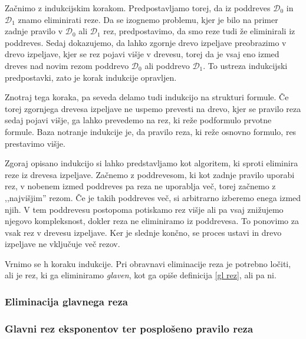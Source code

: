 Začnimo z indukcijskim korakom. Predpostavljamo torej, da iz poddreves $\mathcal{D}_0$ in $\mathcal{D}_1$ znamo eliminirati reze. Da se izognemo problemu, kjer je bilo na primer zadnje pravilo v $\mathcal{D}_0$ ali $\mathcal{D}_1$ rez, predpostavimo, da smo reze tudi že eliminirali iz poddreves. Sedaj dokazujemo, da lahko zgornje drevo izpeljave preobrazimo v drevo izpeljave, kjer se rez pojavi višje v drevesu, torej da je vsaj eno izmed dreves nad novim rezom poddrevo $\mathcal{D}_0$ ali poddrevo $\mathcal{D}_1$. To ustreza indukcijski predpostavki, zato je korak indukcije opravljen.

Znotraj tega koraka, pa seveda delamo tudi indukcijo na strukturi formule. Če torej zgornjega drevesa izpeljave ne uspemo prevesti na drevo, kjer se pravilo reza sedaj pojavi višje, ga lahko prevedemo na rez, ki reže podformulo prvotne formule. Baza notranje indukcije je, da pravilo reza, ki reže osnovno formulo, res prestavimo višje.

\begin{opomba}
    Zgoraj opisano indukcijo si lahko predstavljamo kot algoritem, ki sproti eliminira reze iz drevesa izpeljave. Začnemo z poddrevesom, ki kot zadnje pravilo uporabi rez, v nobenem izmed poddreves pa reza ne uporablja več, torej začnemo z ,,najvišjim'' rezom. Če je takih poddreves več, si arbitrarno izberemo enega izmed njih. V tem poddrevesu postopoma potiskamo rez višje ali pa vsaj znižujemo njegovo kompleksnost, dokler reza ne eliminiramo iz poddrevesa. To ponovimo za vsak rez v drevesu izpeljave. Ker je slednje končno, se proces ustavi in drevo izpeljave ne vključuje več rezov.
\end{opomba}

Vrnimo se h koraku indukcije. Pri obravnavi eliminacije reza je potrebno ločiti, ali je rez, ki ga eliminiramo \emph{glaven}, kot ga opiše definicija \ref{gl rez}, ali pa ni.

\subsubsection{Eliminacija glavnega reza} \label{gl rez vezniki}


\subsubsection{Glavni rez eksponentov ter posplošeno pravilo reza}


